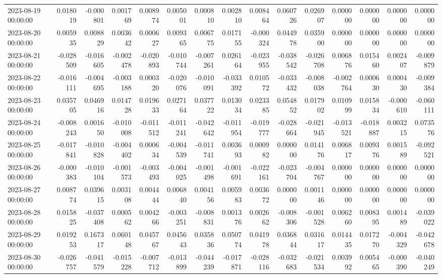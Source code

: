 \begin{tabular}{lrrrrrrrrrrrrrr}
2023-08-19 00:00:00 & 0.018019 & -0.000801 & 0.001769 & 0.008974 & 0.005001 & 0.000810 & 0.002810 & 0.008464 & 0.060726 & 0.026907 & 0.000000 & 0.000000 & 0.000000 & 0.000000 \\
2023-08-20 00:00:00 & 0.005935 & 0.008829 & 0.003642 & 0.000627 & 0.009365 & 0.006775 & 0.017155 & -0.000324 & 0.044978 & 0.035900 & 0.000000 & 0.000000 & 0.000000 & 0.000000 \\
2023-08-21 00:00:00 & -0.028509 & -0.016605 & -0.002478 & -0.020893 & -0.010744 & -0.007261 & 0.026164 & -0.023955 & -0.038542 & -0.026708 & 0.006876 & 0.015460 & 0.002407 & -0.009879 \\
2023-08-22 00:00:00 & -0.016111 & -0.004695 & -0.003188 & 0.000320 & -0.020076 & -0.010091 & -0.033392 & 0.010572 & -0.033432 & -0.008038 & -0.002764 & 0.000630 & 0.000430 & -0.009384 \\
2023-08-23 00:00:00 & 0.035705 & 0.046916 & 0.014728 & 0.019633 & 0.027164 & 0.037722 & 0.013034 & 0.023385 & 0.054852 & 0.017902 & 0.010999 & 0.015834 & -0.000610 & -0.060111 \\
2023-08-24 00:00:00 & -0.008243 & 0.001650 & -0.010008 & -0.011512 & -0.011241 & -0.042642 & -0.011954 & -0.019777 & -0.028664 & -0.021945 & -0.013521 & -0.018887 & 0.003215 & 0.073576 \\
2023-08-25 00:00:00 & -0.017841 & -0.010828 & -0.004402 & 0.000634 & -0.004539 & -0.011741 & 0.003693 & 0.000982 & 0.000000 & 0.014176 & 0.006817 & 0.009376 & 0.001589 & -0.092521 \\
2023-08-26 00:00:00 & -0.000383 & -0.010104 & -0.001573 & -0.003493 & -0.004025 & -0.001498 & -0.001691 & -0.022161 & -0.023704 & -0.004767 & 0.000000 & 0.000000 & 0.000000 & 0.000000 \\
2023-08-27 00:00:00 & 0.008774 & 0.039615 & 0.003108 & 0.004444 & 0.006840 & 0.004156 & 0.005983 & 0.003672 & 0.000000 & 0.001146 & 0.000000 & 0.000000 & 0.000000 & 0.000000 \\
2023-08-28 00:00:00 & 0.015825 & -0.037408 & 0.000562 & 0.004266 & -0.003251 & -0.008831 & 0.001376 & 0.002662 & -0.008306 & -0.001528 & 0.006260 & 0.008395 & 0.001489 & -0.039022 \\
2023-08-29 00:00:00 & 0.019253 & 0.167317 & 0.060148 & 0.045767 & 0.045643 & 0.035836 & 0.050774 & 0.041978 & 0.036844 & 0.031617 & 0.014435 & 0.017270 & -0.004329 & -0.042678 \\
2023-08-30 00:00:00 & -0.026757 & -0.041579 & -0.015228 & -0.007712 & -0.013899 & -0.044239 & -0.017871 & -0.028116 & -0.032683 & -0.021534 & 0.003992 & 0.005465 & -0.000390 & -0.040249 \\

\end{tabular}
